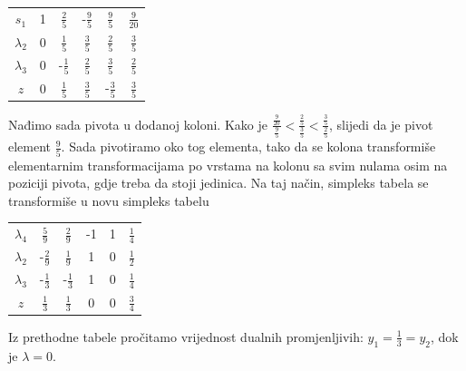 \documentclass[a4paper, utf8, 11pt, colorlinks]{book}
\theoremstyle{definition}
\begin{document}
\begin{center}
	
	\begin{tabular}{c|cccc|c}\vspace{1mm}
		$s_1$	    &   1      &    $\frac{2}{5}$          &   -$\frac{9}{5}$       &  $\frac{9}{5} $        &  $\frac{9}{20}$ \\\vspace{1mm}
		$\lambda_2$  &   0      &    $\frac{1}{5}$         &   $\frac{3}{5}$        &   $\frac{2}{5}$        &  $\frac{3}{5}$             \\\vspace{1mm}
		$\lambda_3$  &   0      &    -$\frac{1}{5}$        &   $\frac{2}{5}$        &   $\frac{3}{5}$         &  $\frac{2}{5}$            \\ \hline\vspace{1mm}
		$z$          &   0      &    $\frac{1}{5}$         &  $ \frac{3}{5}$        &   -$\frac{3}{5}$         & $\frac{3}{5}$
	\end{tabular}
	
\end{center} 
Nađimo sada pivota u dodanoj koloni. Kako je $\frac{\frac{9}{20}}{\frac95} < \frac{\frac25}{\frac35}< \frac{\frac35}{\frac25}$, slijedi da je pivot element $\frac{9}{5}$.  Sada pivotiramo oko tog elementa, tako da se kolona transformiše elementarnim transformacijama po vrstama na kolonu sa svim nulama osim na poziciji pivota, gdje treba da stoji jedinica. Na taj način, simpleks tabela se transformiše u novu simpleks tabelu 
\begin{center}
	
	\begin{tabular}{c|cccc|c}\vspace{1mm}
		$\lambda_4$	 &   $\frac{5}{9}$      &    $\frac{2}{9}$          &   -1       &  1      &  $\frac{1}{4}$ \\\vspace{1mm}
		$\lambda_2$  &   -$\frac{2}{9}$    &   $\frac{1}{9}$        &   1        &   0         &  $\frac{1}{2}$        \\\vspace{1mm}
	    $\lambda_3$  &  -$\frac{1}{3}$     &    -$\frac{1}{3}$      &   1        &   0        &  $\frac{1}{4}$      
		    \\ \hline\vspace{1mm}
		$z$          &   $\frac{1}{3}$     &    $\frac{1}{3}$         &  $0$        &  0         & $\frac{3}{4}$
	\end{tabular}
	
\end{center} 
Iz prethodne tabele pročitamo vrijednost dualnih promjenljivih: $y_1 =  \frac{1}{3}=y_2$, dok je $\lambda=0$. 
\end{document}
